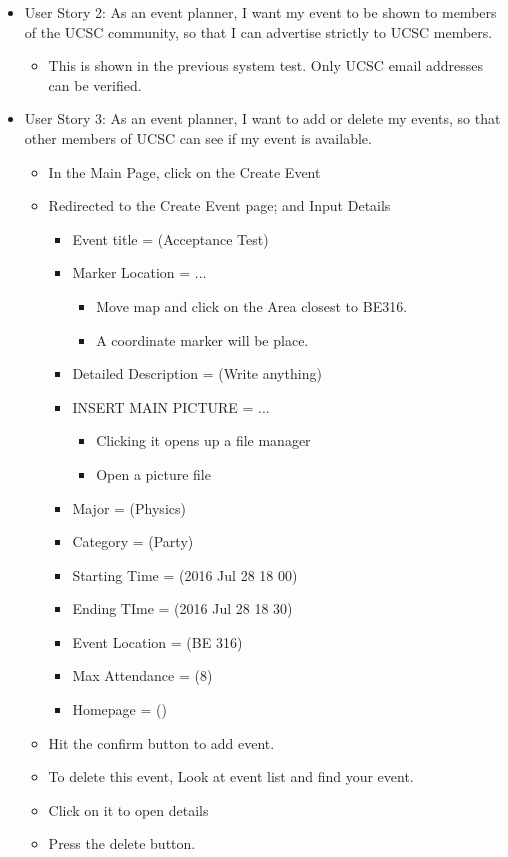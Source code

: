 \documentclass[10pt]{article}
\begin{document}
\begin{itemize}
			      
			\item User Story 2: As an event planner, I want my event to be shown to members of the UCSC community, so that I can advertise strictly to UCSC members.
			\begin{itemize}
				\item This is shown in the previous system test. Only UCSC email addresses can be verified.
			\end{itemize}
			
			\item User Story 3: As an event planner, I want to add or delete my events, so that other members of UCSC can see if my event is available.
			\begin{itemize}
				\item In the Main Page, click on the Create Event
				\item Redirected to the Create Event page; and Input Details
				\begin{itemize}
					\item Event title = (Acceptance Test)
					\item Marker Location = ...
					\begin{itemize}
						\item Move map and click on the Area closest to BE316.
						\item A coordinate marker will be place.
					\end{itemize}
					\item Detailed Description = (Write anything)
					\item INSERT MAIN PICTURE = ...
					\begin{itemize}
						\item Clicking it opens up a file manager
						\item Open a picture file
					\end{itemize}
					\item Major = (Physics)
					\item Category = (Party)
					\item Starting Time = (2016 Jul 28 18 00)
					\item Ending TIme = (2016 Jul 28 18 30)
					\item Event Location = (BE 316)
					\item Max Attendance = (8)
					\item Homepage = ()
				\end{itemize}
				\item Hit the confirm button to add event.
				\item To delete this event, Look at event list and find your event.
				\item Click on it to open details
				\item Press the delete button.
			\end{itemize}


\end{itemize}
\end{document}
